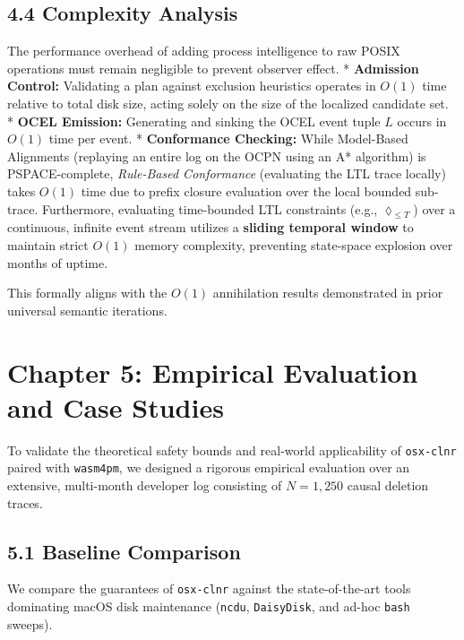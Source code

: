 \documentclass[
  12pt,
]{report}
\begin{document}
\section{4.4 Complexity Analysis}\label{complexity-analysis}

The performance overhead of adding process intelligence to raw POSIX
operations must remain negligible to prevent observer effect. *
\textbf{Admission Control:} Validating a plan against exclusion
heuristics operates in \(O(1)\) time relative to total disk size, acting
solely on the size of the localized candidate set. * \textbf{OCEL
Emission:} Generating and sinking the OCEL event tuple \(L\) occurs in
\(O(1)\) time per event. * \textbf{Conformance Checking:} While
Model-Based Alignments (replaying an entire log on the OCPN using an A*
algorithm) is PSPACE-complete, \emph{Rule-Based Conformance} (evaluating
the LTL trace locally) takes \(O(1)\) time due to prefix closure
evaluation over the local bounded sub-trace. Furthermore, evaluating
time-bounded LTL constraints (e.g., \(\lozenge_{\leq T}\)) over a
continuous, infinite event stream utilizes a \textbf{sliding temporal
window} to maintain strict \(O(1)\) memory complexity, preventing
state-space explosion over months of uptime.

This formally aligns with the \(O(1)\) annihilation results demonstrated
in prior universal semantic iterations.

\chapter{Chapter 5: Empirical Evaluation and Case
Studies}\label{chapter-5-empirical-evaluation-and-case-studies}

To validate the theoretical safety bounds and real-world applicability
of \texttt{osx-clnr} paired with \texttt{wasm4pm}, we designed a
rigorous empirical evaluation over an extensive, multi-month developer
log consisting of \(N = 1,250\) causal deletion traces.

\section{5.1 Baseline Comparison}\label{baseline-comparison}

We compare the guarantees of \texttt{osx-clnr} against the
state-of-the-art tools dominating macOS disk maintenance (\texttt{ncdu},
\texttt{DaisyDisk}, and ad-hoc \texttt{bash} sweeps).
\end{document}
